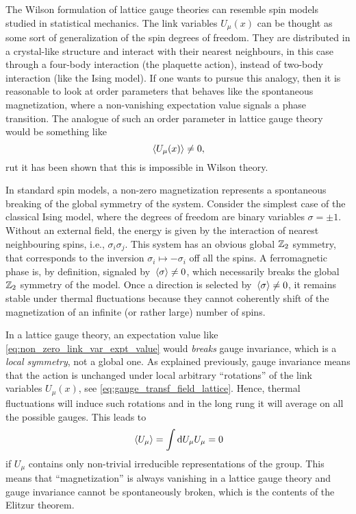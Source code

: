 The Wilson formulation of lattice gauge theories can resemble spin models studied in statistical mechanics.
The link variables $U_{\mu}(x)$ can be thought as some sort of generalization of the spin degrees of freedom.
They are distributed in a crystal-like structure and interact with their nearest neighbours, in this case through a four-body interaction (the plaquette action), instead of two-body interaction (like the Ising model).
If one wants to pursue this analogy, then it is reasonable to look at order parameters that behaves like the spontaneous magnetization, where a non-vanishing expectation value signals a phase transition.
The analogue of such an order parameter in lattice gauge theory would be something like
\begin{equation}
    \ev*{U_{\mu}(x)} \neq 0,
    \label{eq:non_zero_link_var_expt_value}
\end{equation}
rut it has been shown\citneeded {} that this is impossible in Wilson theory.

In standard spin models, a non-zero magnetization represents a spontaneous breaking of the global symmetry of the system.
Consider the simplest case of the classical Ising model, where the degrees of freedom are binary variables $\sigma = \pm 1$.
Without an external field, the energy is given by the interaction of nearest neighbouring spins, i.e., $\sigma_i \sigma_j$.
This system has an obvious global $\mathbb{Z}_2$ symmetry, that corresponds to the inversion $\sigma_i \mapsto -\sigma_i$ off all the spins.
A ferromagnetic phase is, by definition, signaled by $\ev*{\sigma} \neq 0$, which necessarily breaks the global $\mathbb{Z}_2$ symmetry of the model.
Once a direction is selected by $\ev*{\sigma} \neq 0$, it remains stable under thermal fluctuations because they cannot coherently shift of the magnetization of an infinite (or rather large) number of spins.

In a lattice gauge theory, an expectation value like \eqref{eq:non_zero_link_var_expt_value} would \emph{breaks} gauge invariance, which is a \emph{local symmetry}, not a global one.
As explained previously, gauge invariance means that the action is unchanged under local arbitrary ``rotations'' of the link variables $U_{\mu}(x)$, see \eqref{eq:gauge_transf_field_lattice}.
Hence, thermal fluctuations will induce such rotations and in the long rung it will average on all the possible gauges.
This leads to
\begin{equation}
    \ev*{U_{\mu}} = \int \dd U_{\mu} U_{\mu} = 0
\end{equation}
if $U_{\mu}$ contains only non-trivial irreducible representations of the group.
This means that ``magnetization'' is always vanishing in a lattice gauge theory and gauge invariance cannot be spontaneously broken, which is the contents of the Elitzur theorem\citneeded.

